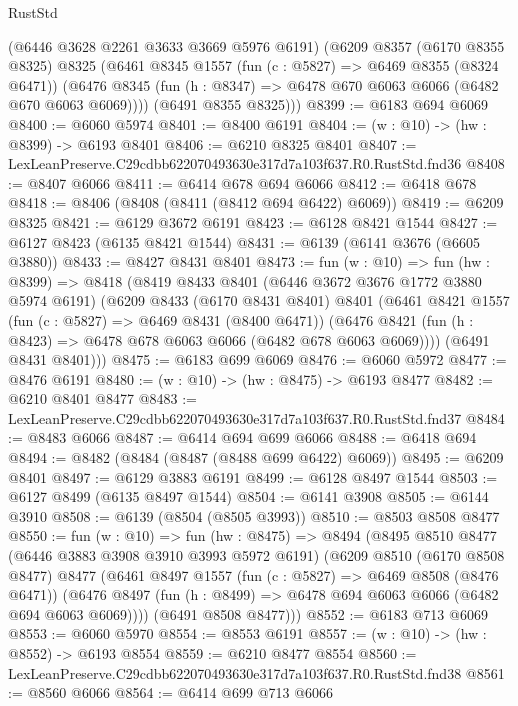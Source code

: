 \begin{lexlean}{RustStd}
\begin{coremodule}
      (@6446 @3628 @2261 @3633 @3669 @5976 @6191)
      (@6209
        @8357
        (@6170 @8355 @8325)
        @8325
        (@6461
          @8345
          @1557
          (fun (c : @5827) => @6469 @8355 (@8324 @6471))
          (@6476 @8345 (fun (h : @8347) => @6478 @670 @6063 @6066 (@6482 @670 @6063 @6069))))
        (@6491 @8355 @8325)))
@8399 := @6183 @694 @6069
@8400 := @6060 @5974
@8401 := @8400 @6191
@8404 := (w : @10) -> (hw : @8399) -> @6193 @8401
@8406 := @6210 @8325 @8401
@8407 := LexLeanPreserve.C29cdbb622070493630e317d7a103f637.R0.RustStd.fnd36
@8408 := @8407 @6066
@8411 := @6414 @678 @694 @6066
@8412 := @6418 @678
@8418 := @8406 (@8408 (@8411 (@8412 @694 @6422) @6069))
@8419 := @6209 @8325
@8421 := @6129 @3672 @6191
@8423 := @6128 @8421 @1544
@8427 := @6127 @8423 (@6135 @8421 @1544)
@8431 := @6139 (@6141 @3676 (@6605 @3880))
@8433 := @8427 @8431 @8401
@8473 := fun (w : @10) =>
  fun (hw : @8399) =>
  @8418
    (@8419
      @8433
      @8401
      (@6446 @3672 @3676 @1772 @3880 @5974 @6191)
      (@6209
        @8433
        (@6170 @8431 @8401)
        @8401
        (@6461
          @8421
          @1557
          (fun (c : @5827) => @6469 @8431 (@8400 @6471))
          (@6476 @8421 (fun (h : @8423) => @6478 @678 @6063 @6066 (@6482 @678 @6063 @6069))))
        (@6491 @8431 @8401)))
@8475 := @6183 @699 @6069
@8476 := @6060 @5972
@8477 := @8476 @6191
@8480 := (w : @10) -> (hw : @8475) -> @6193 @8477
@8482 := @6210 @8401 @8477
@8483 := LexLeanPreserve.C29cdbb622070493630e317d7a103f637.R0.RustStd.fnd37
@8484 := @8483 @6066
@8487 := @6414 @694 @699 @6066
@8488 := @6418 @694
@8494 := @8482 (@8484 (@8487 (@8488 @699 @6422) @6069))
@8495 := @6209 @8401
@8497 := @6129 @3883 @6191
@8499 := @6128 @8497 @1544
@8503 := @6127 @8499 (@6135 @8497 @1544)
@8504 := @6141 @3908
@8505 := @6144 @3910
@8508 := @6139 (@8504 (@8505 @3993))
@8510 := @8503 @8508 @8477
@8550 := fun (w : @10) =>
  fun (hw : @8475) =>
  @8494
    (@8495
      @8510
      @8477
      (@6446 @3883 @3908 @3910 @3993 @5972 @6191)
      (@6209
        @8510
        (@6170 @8508 @8477)
        @8477
        (@6461
          @8497
          @1557
          (fun (c : @5827) => @6469 @8508 (@8476 @6471))
          (@6476 @8497 (fun (h : @8499) => @6478 @694 @6063 @6066 (@6482 @694 @6063 @6069))))
        (@6491 @8508 @8477)))
@8552 := @6183 @713 @6069
@8553 := @6060 @5970
@8554 := @8553 @6191
@8557 := (w : @10) -> (hw : @8552) -> @6193 @8554
@8559 := @6210 @8477 @8554
@8560 := LexLeanPreserve.C29cdbb622070493630e317d7a103f637.R0.RustStd.fnd38
@8561 := @8560 @6066
@8564 := @6414 @699 @713 @6066

\end{coremodule}
\end{lexlean}
